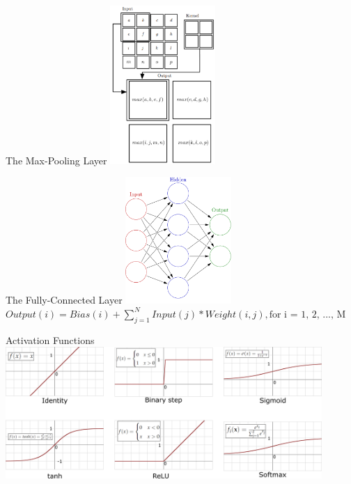 \begin{frame}{The Max-Pooling Layer}
	\centering
	\includegraphics[width=0.3\textwidth]{../Images/CNNArchitectures/maxpooling-operation.png}\\
\end{frame}

\begin{frame}{The Fully-Connected Layer}
	\centering
	\includegraphics[width=0.3\textwidth]{../Images/CNNArchitectures/simplified-neural-network-graph.png}\\
	$Output(i) = Bias(i) + \sum_{j = 1}^{N} Input(j) * Weight(i, j), \mbox{for i = 1, 2, ..., M}$
\end{frame}

\begin{frame}{Activation Functions}
	\centering
	\includegraphics[width=0.9\textwidth]{../Images/CNNArchitectures/Activation_functions.png}\\
\end{frame}

